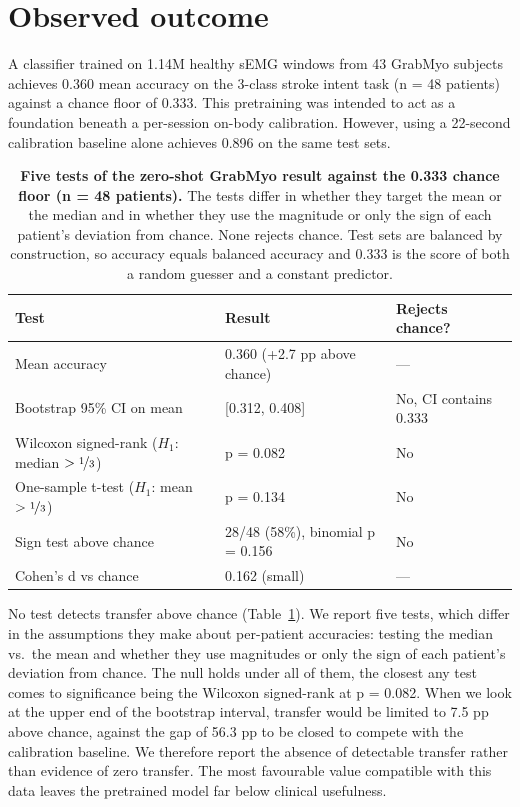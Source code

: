 \documentclass{article}
\begin{document}
\section{Observed outcome}

A classifier trained on 1.14M healthy sEMG windows from 43 GrabMyo subjects achieves 0.360 mean accuracy on the 3-class stroke intent task (n = 48 patients) against a chance floor of 0.333. This pretraining was intended to act as a foundation beneath a per-session on-body calibration. However, using a 22-second calibration baseline alone achieves 0.896 on the same test sets.

\begin{table}[t]
  \caption{\textbf{Five tests of the zero-shot GrabMyo result against the 0.333 chance floor (n = 48 patients).} The tests differ in whether they target the mean or the median and in whether they use the magnitude or only the sign of each patient's deviation from chance. None rejects chance. Test sets are balanced by construction, so accuracy equals balanced accuracy and 0.333 is the score of both a random guesser and a constant predictor.}
  \label{tab:nulltests}
  \centering
  \begin{tabular}{lll}
    \toprule
    Test & Result & Rejects chance? \\
    \midrule
    Mean accuracy & 0.360 (+2.7 pp above chance) & --- \\
    Bootstrap 95\% CI on mean & [0.312, 0.408] & No, CI contains 0.333 \\
    Wilcoxon signed-rank ($H_1$: median $> \nicefrac{1}{3}$) & p = 0.082 & No \\
    One-sample t-test ($H_1$: mean $> \nicefrac{1}{3}$) & p = 0.134 & No \\
    Sign test above chance & 28/48 (58\%), binomial p = 0.156 & No \\
    Cohen's d vs chance & 0.162 (small) & --- \\
    \bottomrule
  \end{tabular}
\end{table}

No test detects transfer above chance (Table~\ref{tab:nulltests}). We report five tests, which differ in the assumptions they make about per-patient accuracies: testing the median vs.\ the mean and whether they use magnitudes or only the sign of each patient's deviation from chance. The null holds under all of them, the closest any test comes to significance being the Wilcoxon signed-rank at p = 0.082. When we look at the upper end of the bootstrap interval, transfer would be limited to 7.5 pp above chance, against the gap of 56.3 pp to be closed to compete with the calibration baseline. We therefore report the absence of detectable transfer rather than evidence of zero transfer. The most favourable value compatible with this data leaves the pretrained model far below clinical usefulness.
\end{document}
